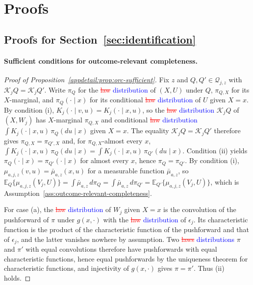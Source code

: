 \section{Proofs}
\label{app:proofs}

\subsection{Proofs for Section~\ref{sec:identification}}

\paragraph{Sufficient conditions for outcome-relevant completeness.}
\begin{proof}[Proof of Proposition~\ref{appdetail:prop:orc-sufficient}]
Fix $z$ and $Q,Q'\in\mathcal Q_{j,z}$ with $\mathcal K_jQ=\mathcal K_jQ'$. Write $\pi_Q$ for the \textcolor{red}{\sout{law}} \textcolor{blue}{distribution} of $(X,U)$ under $Q$, $\pi_{Q,X}$ for its $X$-marginal, and $\pi_Q(\cdot\mid x)$ for its conditional \textcolor{red}{\sout{law}} \textcolor{blue}{distribution} of $U$ given $X=x$. By condition (i), $K_j(\cdot\mid v,u)=K_j(\cdot\mid x,u)$, so the \textcolor{red}{\sout{law}} \textcolor{blue}{distribution} $\mathcal K_jQ$ of $(X,W_j)$ has $X$-marginal $\pi_{Q,X}$ and conditional \textcolor{red}{\sout{law}} \textcolor{blue}{distribution} $\int K_j(\cdot\mid x,u)\,\pi_Q(du\mid x)$ given $X=x$. The equality $\mathcal K_jQ=\mathcal K_jQ'$ therefore gives $\pi_{Q,X}=\pi_{Q',X}$ and, for $\pi_{Q,X}$-almost every $x$, $\int K_j(\cdot\mid x,u)\,\pi_Q(du\mid x)=\int K_j(\cdot\mid x,u)\,\pi_{Q'}(du\mid x)$. Condition (ii) yields $\pi_Q(\cdot\mid x)=\pi_{Q'}(\cdot\mid x)$ for almost every $x$, hence $\pi_Q=\pi_{Q'}$. By condition (i), $\mu_{a,j,z}(v,u)=\bar\mu_{a,z}(x,u)$ for a measurable function $\bar\mu_{a,z}$, so $\mathbb E_Q\{\mu_{a,j,z}(V_j,U)\}=\int\bar\mu_{a,z}\,d\pi_Q=\int\bar\mu_{a,z}\,d\pi_{Q'}=\mathbb E_{Q'}\{\mu_{a,j,z}(V_j,U)\}$, which is Assumption~\ref{ass:outcome-relevant-completeness}.

For case (a), the \textcolor{red}{\sout{law}} \textcolor{blue}{distribution} of $W_j$ given $X=x$ is the convolution of the pushforward of $\pi$ under $g(x,\cdot)$ with the \textcolor{red}{\sout{law}} \textcolor{blue}{distribution} of $\epsilon_j$. Its characteristic function is the product of the characteristic function of the pushforward and that of $\epsilon_j$, and the latter vanishes nowhere by assumption. Two \textcolor{red}{\sout{laws}} \textcolor{blue}{distributions} $\pi$ and $\pi'$ with equal convolutions therefore have pushforwards with equal characteristic functions, hence equal pushforwards by the uniqueness theorem for characteristic functions, and injectivity of $g(x,\cdot)$ gives $\pi=\pi'$. Thus (ii) holds.


\end{proof}
